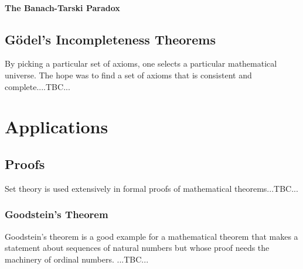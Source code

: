 
\paragraph{The Banach-Tarski Paradox}



\subsection{Gödel's Incompleteness Theorems}
By picking a particular set of axioms, one selects a particular mathematical universe. The hope was to find a set of axioms that is consistent and complete....TBC...






\section{Applications}

\subsection{Proofs}
Set theory is used extensively in formal proofs of mathematical theorems...TBC...

\subsubsection{Goodstein's Theorem}
Goodstein's theorem is a good example for a mathematical theorem that makes a statement about sequences of natural numbers but whose proof needs the machinery of ordinal numbers. ...TBC...


